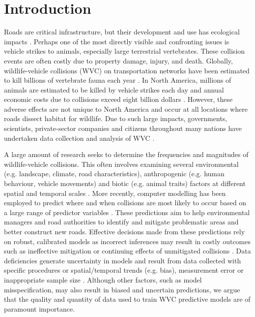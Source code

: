 \newpage
\section{Introduction}

Roads are critical infrastructure, but their development and use has ecological impacts \citep{form03}. Perhaps one of the most directly visible and confronting issues is vehicle strikes to animals, especially large terrestrial vertebrates. These collision events are often costly due to property damage, injury, and death. Globally, wildlife-vehicle collisions (WVC) on transportation networks have been estimated to kill billions of vertebrate fauna each year \citep{seil06}. In North America, millions of animals are estimated to be killed by vehicle strikes each day \citep{form98} and annual economic costs due to collisions exceed eight billion dollars \citep{huij07b}. However, these adverse effects are not unique to North America and occur at all locations where roads dissect habitat for wildlife. Due to such large impacts, governments, scientists, private-sector companies and citizens throughout many nations have undertaken data collection and analysis of WVC \citep[see][]{rvdr15}.

A large amount of research seeks to determine the frequencies and magnitudes of wildlife-vehicle collisions. This often involves examining several environmental (e.g. landscape, climate, road characteristics), anthropogenic (e.g. human behaviour, vehicle movements) and biotic (e.g. animal traits) factors at different spatial and temporal scales \citep{litv08}. More recently, computer modelling has been employed to predict where and when collisions are most likely to occur based on a large range of predictor variables \citep[see review in][]{guns11}. These predictions aim to help environmental managers and road authorities to identify and mitigate problematic areas and better construct new roads. Effective decisions made from these predictions rely on robust, calibrated models as incorrect inferences may result in costly outcomes such as ineffective mitigation \citep[see][]{huij09} or continuing effects of unmitigated collisions \citep[see][]{biss08b}. Data deficiencies generate uncertainty in models and result from data collected with specific procedures or spatial/temporal trends (e.g. bias), measurement error or inappropriate sample size \citep{bean12}. Although other factors, such as model misspecification, may also result in biased and uncertain predictions, we argue that the quality and quantity of data used to train WVC predictive models are of paramount importance.

